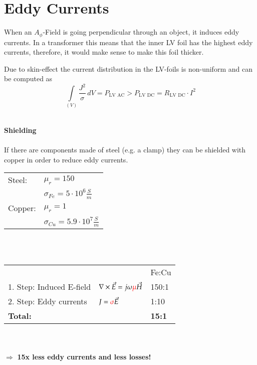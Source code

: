 \section{Eddy Currents}
When an $A_\phi$-Field is going perpendicular through an object, it induces eddy currents. In a transformer this means that the inner LV foil has the highest eddy currents, therefore, it would make sense to make this foil thicker. \newline

Due to skin-effect the current distribution in the LV-foils is non-uniform and can be computed as
\begin{equation*}
	\int\limits_{\left(V\right)} \frac{J^2}{\sigma}\,dV = P_\textrm{LV AC} > P_\textrm{LV DC} = R_\textrm{LV DC} \cdot I^2
\end{equation*}

\textbf{\\Shielding \\ \\} 
If there are components made of steel (e.g. a clamp) they can be shielded with copper in order to reduce eddy currents. \newline 
\begin{tabular}{ll}
	Steel: 	& \(\displaystyle \mu_r = 150\) \\
			& \(\displaystyle \sigma_{Fe} = 5 \cdot 10^6 \frac{S}{m} \) \\
	Copper: & \(\displaystyle \mu_r = 1 \) \\
			& \(\displaystyle \sigma_{Cu} = 5.9 \cdot 10^7 \frac{S}{m} \) \\
\end{tabular} \\ \\
\begin{tabular}{lll}
	 & & Fe:Cu \\
	1. Step: Induced E-field & \(\displaystyle \nabla \times \vec{E} = j\omega\color{red}\mu\color{black}\vec{H} \) & 150:1 \\
	2. Step: Eddy currents  & \(\displaystyle J = \color{red}\sigma\color{black}\vec{E} \) & 1:10 \\
	\textbf{Total:} & & \textbf{15:1}
\end{tabular}\\ \\
$\Rightarrow$ \textbf{15x less eddy currents and less losses!}